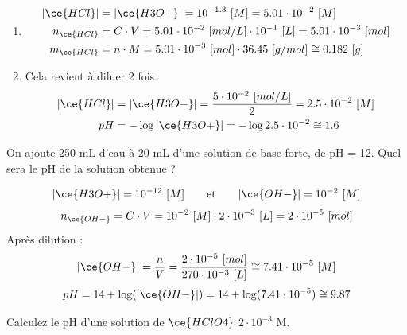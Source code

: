 \documentclass[
  11pt,
  a4paper,
  openany]{book}
\providecommand{\tightlist}{%
  \setlength{\itemsep}{0pt}\setlength{\parskip}{0pt}}
\begin{document}
\begin{Answer}

\begin{enumerate}
\def\labelenumi{\alph{enumi}.}
\tightlist
\item
  \[
  \begin{split}
  |\ce{HCl}| &= |\ce{H3O+}| = 10^{-1.3}\ [M] = 5.01 \cdot 10^{-2}\ [M] \\
  n_{\ce{HCl}} &= C \cdot V = 5.01 \cdot 10^{-2}\ [mol/L] \cdot 10^{-1}\ [L] = 5.01 \cdot 10^{-3}\ [mol] \\
  m_{\ce{HCl}} &= n \cdot M = 5.01 \cdot 10^{-3}\ [mol] \cdot 36.45\ [g/mol] \cong 0.182\ [g]
  \end{split}
  \]
\item
  Cela revient à diluer 2 fois.
  \[
  \begin{split}
  |\ce{HCl}| &= |\ce{H3O+}| = \frac{5 \cdot 10^{-2}\ [mol/L]}{2} = 2.5 \cdot 10^{-2}\ [M] \\
  pH &= - \log |\ce{H3O+}| = - \log 2.5 \cdot 10^{-2} \cong 1.6
  \end{split}
  \]
\end{enumerate}

\end{Answer}

\clearpage

\begin{Exercise}
On ajoute 250 mL d'eau à 20 mL d'une solution de base forte, de pH = 12. Quel sera le pH de la solution obtenue ?

\end{Exercise}

\begin{Answer}
\[
\begin{split}
|\ce{H3O+}| = 10^{-12}\ [M]
\end{split}
\qquad \text{et} \qquad
\begin{split}
|\ce{OH-}| = 10^{-2}\ [M]
\end{split}
\]
\[
n_{\ce{OH-}} = C \cdot V = 10^{-2}\ [M] \cdot 2 \cdot 10^{-3}\ [L] = 2 \cdot 10^{-5}\ [mol]
\]
Après dilution :
\[
|\ce{OH-}| = \frac{n}{V} = \frac{2 \cdot 10^{-5}\ [mol]}{270 \cdot 10^{-3}\ [L]} \cong 7.41 \cdot 10^{-5}\ [M]
\]
\[
pH = 14 + \log(|\ce{OH-}|) = 14 + \log(7.41 \cdot 10^{-5}) \cong 9.87
\]

\end{Answer}

\begin{Exercise}
Calculez le pH d'une solution de \(\ce{HClO4}\) \(2 \cdot 10^{-3}\) M.

\end{Exercise}
\end{document}
